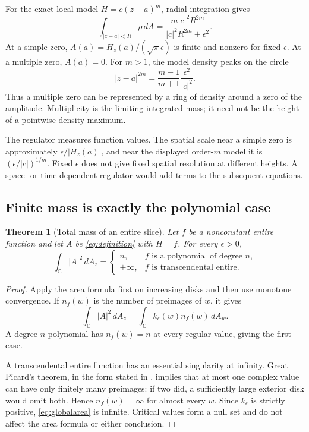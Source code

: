\documentclass[11pt]{article}
\newcommand{\C}{\mathbb C}
\newcommand{\dd}{\,d}
\newcommand{\eps}{\epsilon}
\newtheorem{theorem}{Theorem}[section]
\theoremstyle{definition}
\theoremstyle{remark}
\begin{document}
For the exact local model $H=c(z-a)^m$, radial integration gives
\begin{equation}
 \int_{|z-a|<R}\rho\dd A
 =\frac{m|c|^2R^{2m}}{|c|^2R^{2m}+\eps^2}. \label{eq:monomial}
\end{equation}
At a simple zero, $A(a)=H_z(a)/(\sqrt\pi\eps)$ is finite and
nonzero for fixed $\eps$. At a multiple zero, $A(a)=0$. For $m>1$,
the model density peaks on the circle
\[
 |z-a|^{2m}=\frac{m-1}{m+1}\frac{\eps^2}{|c|^2}.
\]
Thus a multiple zero can be represented by a ring of density around a
zero of the amplitude. Multiplicity is the limiting integrated mass;
it need not be the height of a pointwise density maximum.

The regulator measures function values. The spatial scale near a simple
zero is approximately $\eps/|H_z(a)|$, and near the displayed
order-$m$ model it is $(\eps/|c|)^{1/m}$. Fixed $\eps$ does not give
fixed spatial resolution at different heights. A space- or
time-dependent regulator would add terms to the subsequent equations.

\subsection{Finite mass is exactly the polynomial case}

\begin{theorem}[Total mass of an entire slice]
\label{thm:massclassification}
Let $f$ be a nonconstant entire function and let $A$ be
\eqref{eq:definition} with $H=f$. For every $\eps>0$,
\begin{equation}
 \int_\C |A|^2\dd A_z=
 \begin{cases}
 n,&f\text{ is a polynomial of degree }n,\\
 +\infty,&f\text{ is transcendental entire}.
 \end{cases} \label{eq:massclassification}
\end{equation}
\end{theorem}
\begin{proof}
Apply the area formula first on increasing disks and then use monotone
convergence. If $n_f(w)$ is the number of preimages of $w$, it gives
\begin{equation}
 \int_\C |A|^2\dd A_z
 =\int_\C k_\eps(w)n_f(w)\dd A_w. \label{eq:globalarea}
\end{equation}
A degree-$n$ polynomial has $n_f(w)=n$ at every regular value, giving
the first case.

A transcendental entire function has an essential singularity at
infinity. Great Picard's theorem, in the form stated in
\cite[\S1.10(iii)]{DLMFPicard}, implies that at most one complex value
can have only finitely many preimages: if two did, a sufficiently large
exterior disk would omit both. Hence $n_f(w)=\infty$ for almost every
$w$. Since $k_\eps$ is strictly positive, \eqref{eq:globalarea} is
infinite. Critical values form a null set and do not affect the area
formula or either conclusion.
\end{proof}
\end{document}
